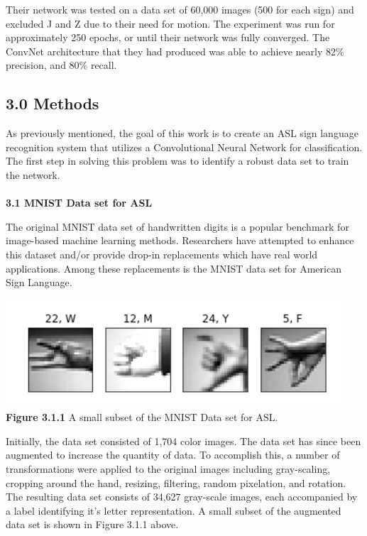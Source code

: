 \documentclass[11pt]{article}
\begin{document}
\begin{multicols}{2}
\par
Their network was tested on a data set of 60,000 images (500 for each sign) and excluded J and Z due to their need for motion.  The experiment was run for approximately 250 epochs, or until their network was fully converged.  The ConvNet architecture that they had produced was able to achieve nearly 82\% precision, and 80\% recall.

\subsection*{3.0 Methods}
As previously mentioned, the goal of this work is to create an ASL sign language recognition system that utilizes a Convolutional Neural Network for classification.  The first step in solving this problem was to identify a robust data set to train the network. \\ \\
\textbf{3.1 MNIST Data set for ASL}
\par
The original MNIST data set of handwritten digits is a popular benchmark for image-based machine learning methods.  Researchers have attempted to enhance this dataset and/or provide drop-in replacements which have real world applications.  Among these replacements is the MNIST data set for American Sign Language.
\begin{center}
\includegraphics{DataPreview}
\textbf{Figure 3.1.1} A small subset of the MNIST Data set for ASL.
\end{center}
\par
Initially, the data set consisted of 1,704 color images.  The data set has since been augmented to increase the quantity of data.  To accomplish this, a number of transformations were applied to the original images including gray-scaling, cropping around the hand, resizing, filtering, random pixelation, and rotation.  The resulting data set consists of 34,627 gray-scale images, each accompanied by a label identifying it's letter representation.  A small subset of the augmented data set is shown in Figure 3.1.1 above. \\
\\ 

\end{multicols}
\end{document}
